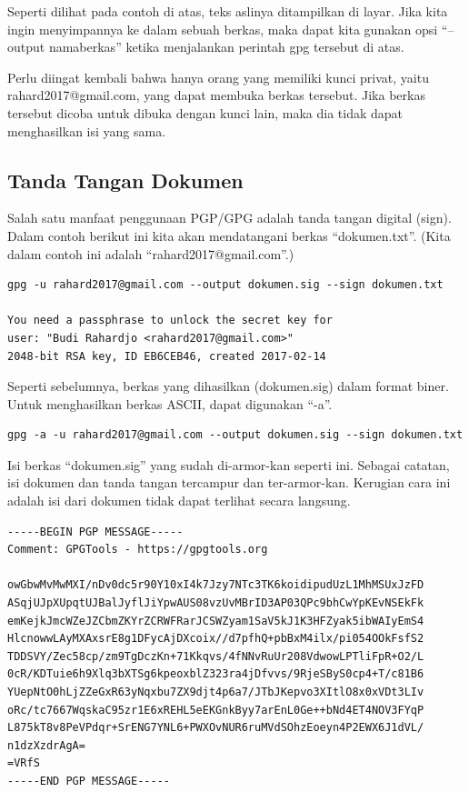 Seperti dilihat pada contoh di atas, teks aslinya ditampilkan di layar. Jika
kita ingin menyimpannya ke dalam sebuah berkas, maka dapat kita gunakan opsi
``--output namaberkas'' ketika menjalankan perintah gpg tersebut di atas.

Perlu diingat kembali bahwa hanya orang yang memiliki kunci privat, yaitu
rahard2017@gmail.com, yang dapat membuka berkas tersebut. Jika berkas tersebut
dicoba untuk dibuka dengan kunci lain, maka dia tidak dapat menghasilkan isi
yang sama.

\subsection{Tanda Tangan Dokumen}
Salah satu manfaat penggunaan PGP/GPG adalah tanda tangan digital (sign). Dalam
contoh berikut ini kita akan mendatangani berkas ``dokumen.txt''. (Kita dalam
contoh ini adalah ``rahard2017@gmail.com''.)

\begin{verbatim}
gpg -u rahard2017@gmail.com --output dokumen.sig --sign dokumen.txt

You need a passphrase to unlock the secret key for
user: "Budi Rahardjo <rahard2017@gmail.com>"
2048-bit RSA key, ID EB6CEB46, created 2017-02-14
\end{verbatim}

Seperti sebelumnya, berkas yang dihasilkan (dokumen.sig) dalam format biner.
Untuk menghasilkan berkas ASCII, dapat digunakan ``-a''.

\begin{verbatim}
gpg -a -u rahard2017@gmail.com --output dokumen.sig --sign dokumen.txt
\end{verbatim}

Isi berkas ``dokumen.sig'' yang sudah di-armor-kan seperti ini. Sebagai
catatan, isi dokumen dan tanda tangan tercampur dan ter-armor-kan. Kerugian
cara ini adalah isi dari dokumen tidak dapat terlihat secara langsung.

\begin{verbatim}
-----BEGIN PGP MESSAGE-----
Comment: GPGTools - https://gpgtools.org

owGbwMvMwMXI/nDv0dc5r90Y10xI4k7Jzy7NTc3TK6koidipudUzL1MhMSUxJzFD
ASqjUJpXUpqtUJBalJyflJiYpwAUS08vzUvMBrID3AP03QPc9bhCwYpKEvNSEkFk
emKejkJmcWZeJZCbmZKYrZCRWFRarJCSWZyam1SaV5kJ1K3HFZyak5ibWAIyEmS4
HlcnowwLAyMXAxsrE8g1DFycAjDXcoix//d7pfhQ+pbBxM4ilx/pi054OOkFsfS2
TDDSVY/Zec58cp/zm9TgDczKn+71Kkqvs/4fNNvRuUr208VdwowLPTliFpR+O2/L
0cR/KDTuie6h9Xlq3bXTSg6kpeoxblZ323ra4jDfvvs/9RjeSByS0cp4+T/c81B6
YUepNtO0hLjZZeGxR63yNqxbu7ZX9djt4p6a7/JTbJKepvo3XItlO8x0xVDt3LIv
oRc/tc7667WqskaC95zr1E6xREHL5eEKGnkByy7arEnL0Ge++bNd4ET4NOV3FYqP
L875kT8v8PeVPdqr+SrENG7YNL6+PWXOvNUR6ruMVdSOhzEoeyn4P2EWX6J1dVL/
n1dzXzdrAgA=
=VRfS
-----END PGP MESSAGE-----
\end{verbatim}

